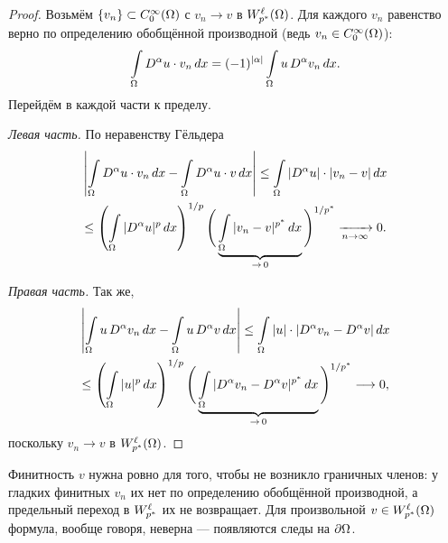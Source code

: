 \begin{proof}
Возьмём $\{v_n\} \subset C_0^\infty(\Omega)$ с $v_n \to v$ в $W_{p^*}^{\ell}(\Omega)$. Для
каждого $v_n$ равенство верно по определению обобщённой производной (ведь
$v_n \in C_0^\infty(\Omega)$):
\[
  \int\limits_\Omega D^\alpha u \cdot v_n\, dx
  = (-1)^{|\alpha|} \int\limits_\Omega u\, D^\alpha v_n\, dx .
\]
Перейдём в каждой части к пределу.

\emph{Левая часть.} По неравенству Гёльдера
\begin{multline*}
  \left| \int\limits_\Omega D^\alpha u \cdot v_n\, dx - \int\limits_\Omega D^\alpha u \cdot v\, dx \right|
  \le \int\limits_\Omega |D^\alpha u| \cdot |v_n - v|\, dx \\
  \le \left( \int\limits_\Omega |D^\alpha u|^p\, dx \right)^{1/p}
      \Bigg( \underbrace{\int\limits_\Omega |v_n - v|^{p^*}\, dx}_{\to\, 0} \Bigg)^{1/p^*}
  \xrightarrow[n \to \infty]{} 0 .
\end{multline*}

\emph{Правая часть.} Так же,
\begin{multline*}
  \left| \int\limits_\Omega u\, D^\alpha v_n\, dx - \int\limits_\Omega u\, D^\alpha v\, dx \right|
  \le \int\limits_\Omega |u| \cdot |D^\alpha v_n - D^\alpha v|\, dx \\
  \le \left( \int\limits_\Omega |u|^p\, dx \right)^{1/p}
      \Bigg( \underbrace{\int\limits_\Omega |D^\alpha v_n - D^\alpha v|^{p^*}\, dx}_{\to\, 0} \Bigg)^{1/p^*}
  \longrightarrow 0 ,
\end{multline*}
поскольку $v_n \to v$ в $W_{p^*}^{\ell}(\Omega)$.
\end{proof}

\begin{idea}
Финитность $v$ нужна ровно для того, чтобы не возникло граничных членов: у гладких
финитных $v_n$ их нет по определению обобщённой производной, а предельный переход
в $W_{p^*}^{\ell}$ их не возвращает. Для произвольной $v \in W_{p^*}^{\ell}(\Omega)$ формула,
вообще говоря, неверна — появляются следы на $\partial\Omega$.
\end{idea}
